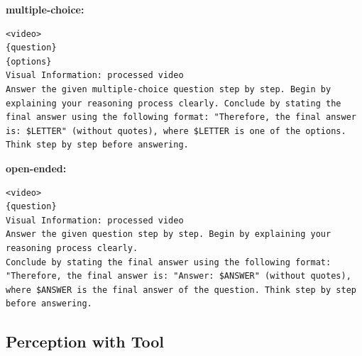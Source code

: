 \begin{tcolorbox}[
  enhanced,
  title=MMVU,
  fonttitle=\bfseries,
  colframe=black,
  colback=white,
  toptitle=1mm,
  bottomtitle=1mm,
  top=1mm,
  bottom=1mm,
  left=1mm,
  right=1mm,
  middle=1mm,
  segmentation style={solid, draw=black, line width=0.4pt},
]

\textbf{multiple-choice:}

\begin{Verbatim}[breaklines=true, breakanywhere=true, breaksymbolleft={}]
<video>
{question}
{options}
Visual Information: processed video
Answer the given multiple-choice question step by step. Begin by explaining your reasoning process clearly. Conclude by stating the final answer using the following format: "Therefore, the final answer is: $LETTER" (without quotes), where $LETTER is one of the options. Think step by step before answering.
\end{Verbatim}
\tcbline

\textbf{open-ended:}
\begin{Verbatim}[breaklines=true, breakanywhere=true, breaksymbolleft={}]
<video>
{question}
Visual Information: processed video
Answer the given question step by step. Begin by explaining your reasoning process clearly. 
Conclude by stating the final answer using the following format: "Therefore, the final answer is: "Answer: $ANSWER" (without quotes), where $ANSWER is the final answer of the question. Think step by step before answering.
\end{Verbatim}

\end{tcolorbox}

\subsection{Perception with Tool}
\label{sec:perception_w_tool}

